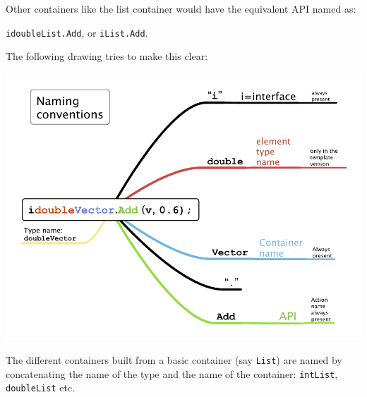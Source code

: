 \documentclass[12pt,a4paper]{memoir} %
\begin{document}
Other containers like the list container would have the equivalent API named as: 

\verb,idoubleList.Add,, or \verb,iList.Add,.

The following drawing tries to make this clear:

\includegraphics[scale=0.46]{NamingConventions.png}

The different containers built from a basic container (say \verb,List,) are named by concatenating the name of the type and the name of the container:
\verb,intList,, \verb,doubleList, etc.
\end{document}
